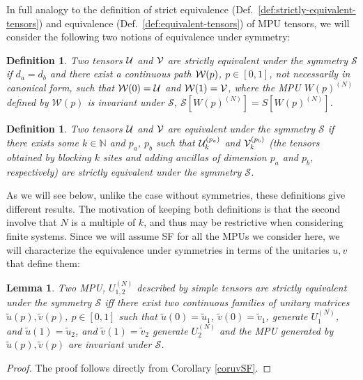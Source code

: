 \documentclass[pra,twocolumn,nofootinbib,superscriptaddress]{revtex4-1}
\newtheorem{lem}[thm]{Lemma}
\newtheorem{defn}[thm]{Definition}
\begin{document}
In full analogy to the definition of strict equivalence
(Def.~\ref{def:strictly-equivalent-tensors}) and equivalence
(Def.~\ref{def:equivalent-tensors}) of MPU tensors, we will consider the
following two notions of equivalence under symmetry:

\begin{defn}
	\label{def:strictly-equivalent-symmetry}
	Two tensors ${\cal U}$ and ${\cal V}$ are {\em strictly equivalent under
			the symmetry $\mathcal S$} if $d_a=d_b$ and there exist a continuous path
	${\cal W}(p)$, $p\in[0,1]$, not necessarily in canonical form,
	such that ${\cal W}(0)={\cal U}$ and
	${\cal W}(1)={\cal V}$, where the MPU $W(p)^{(N)}$ defined by $\mathcal
		W(p)$ is invariant under $\mathcal S$, $\mathcal
		S[W(p)^{(N)}]=S[W(p)^{(N)}]$.
\end{defn}

\begin{defn}
	\label{def:equivalent-symmetry}
	Two tensors ${\cal U}$ and ${\cal V}$ are {\em equivalent under the
			symmetry $\mathcal S$} if there exists some $k\in \mathds{N}$ and $p_a$,
	$p_b$ such that ${\cal U}^{(p_a)}_{k}$ and ${\cal V}^{(p_b)}_{k}$ (the
	tensors obtained by blocking $k$ sites and adding ancillas of dimension
	$p_a$ and $p_b$, respectively) are strictly equivalent under the symmetry
	$\mathcal S$.
\end{defn}

As we will see below, unlike the case without symmetries, these definitions give different results. The motivation of keeping both definitions is that the second involve that $N$ is a multiple of $k$, and thus may be restrictive when considering finite systems.
Since we will assume SF for all the MPUs we consider here, we will characterize the equivalence under symmetries in terms of the unitaries $u,v$ that define them:

\begin{lem}
	\label{lem:equivalent-symmetry}
	Two MPU, $U_{1,2}^{(N)}$ described by simple tensors are strictly
	equivalent under the symmetry $\mathcal S$ iff there exist two continuous families
	of unitary matrices $\tilde u(p),\tilde v(p)$, $p\in[0,1]$ such that $\tilde u(0)=\tilde u_1$,
	$\tilde v(0)=\tilde v_1$, generate $U_{1}^{(N)}$, and  $\tilde u(1)=\tilde u_2$, and $\tilde v(1)=\tilde v_2$ generate $U_{2}^{(N)}$
	and the MPU generated by $\tilde u(p),\tilde v(p)$ are invariant under $\mathcal S$.
\end{lem}

\begin{proof}
	The proof follows directly from Corollary \ref{coruvSF}.
\end{proof}
\end{document}
